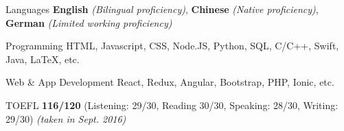 
\begin{cvskills}
  \cvskill
    {Languages} %
    {\textbf{English} \textit{(Bilingual proficiency)}, \textbf{Chinese} \textit{(Native proficiency)}, \textbf{German} \textit{(Limited working proficiency)}} %

  \cvskill
    {Programming} %
    {HTML, Javascript, CSS, Node.JS, Python, SQL, C/C++, Swift, Java, LaTeX, etc. } %

  \cvskill
    {Web \& App Development} %
    {React, Redux, Angular, Bootstrap, PHP, Ionic, etc.} %
  

\end{cvskills}




\begin{cvskills}

  \cvskill
    {TOEFL} %
    {\textbf{116/120} (Listening: 29/30, Reading 30/30, Speaking: 28/30, Writing: 29/30) \textit{(taken in Sept. 2016)}} %

\end{cvskills}